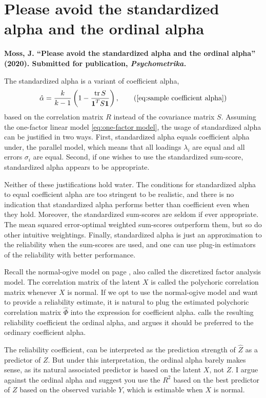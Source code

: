 \section{Please avoid the standardized alpha and the ordinal alpha}
\textbf{Moss, J. ``Please avoid the standardized alpha and the ordinal alpha''
(2020). Submitted for publication, \emph{Psychometrika.}}

The standardized alpha is a variant of coefficient alpha,
\begin{equation}
\hat{\alpha}=\frac{k}{k-1}\left(1-\frac{\tr{S}}{\boldsymbol{1}^{T}S\boldsymbol{1}}\right),\tag{\ref{eq:sample coefficient alpha}}
\end{equation}
based on the correlation matrix $R$ instead of the covariance matrix $S$. Assuming the one-factor linear model \eqref{eq:one-factor model}, the usage of standardized alpha can be justified in two ways. First, standardized alpha equals coefficient alpha under, the parallel model, which means that all loadings $\lambda_i$ are equal and all errors $\sigma_i$ are equal. Second, if one wishes to use the standardized sum-score, standardized alpha appears to be appropriate.

Neither of these justifications hold water. The conditions for standardized alpha to equal coefficient alpha are too stringent to be realistic, and there is no indication that standardized alpha performs better than coefficient even when they hold. Moreover, the standardized sum-scores are seldom if ever appropriate. The mean squared error-optimal weighted sum-scores outperform them, but so do other intuitive weightings. Finally, standardized alpha is just an approximation to the reliability when the sum-scores are used, and one can use plug-in estimators of the reliability with better performance.

Recall the normal-ogive model on page \pageref{eq:discretization model}, also called the discretized factor analysis model. The correlation matrix of the latent $X$ is called the polychoric correlation matrix whenever $X$ is normal. If we opt to use the normal-ogive model and want to provide a reliability estimate, it is natural to plug the estimated polychoric correlation matrix $\hat{\Phi}$ into the expression for coefficient alpha. \textcite{Zumbo2007-ap} calls the resulting reliability coefficient the ordinal alpha, and argues it should be preferred to the ordinary coefficient alpha. 

The reliability coefficient, can be interpreted as the prediction strength of $\hat{Z}$ as a predictor of $Z$. But under this interpretation, the ordinal alpha barely makes sense, as its natural associated predictor is based on the latent $X$, not $Z$. I argue against the ordinal alpha and suggest you use the $R^2$ based on the best predictor of $Z$ based on the observed variable $Y$, which is estimable when $X$ is normal.

